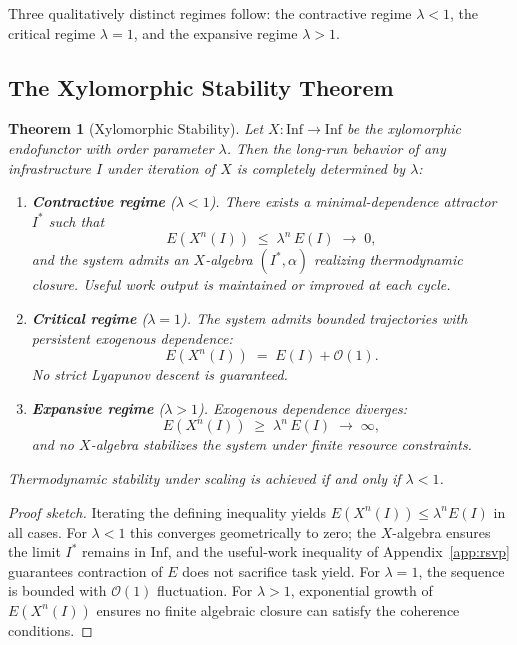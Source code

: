\documentclass[11pt,a4paper]{article}
\theoremstyle{plain}
\newtheorem{theorem}{Theorem}
\theoremstyle{definition}
\theoremstyle{remark}
\begin{document}
Three qualitatively distinct regimes follow: the contractive regime
$\lambda < 1$, the critical regime $\lambda = 1$, and the expansive regime
$\lambda > 1$.

\subsection{The Xylomorphic Stability Theorem}

\begin{theorem}[Xylomorphic Stability]
\label{thm:stability}
Let $X : \mathrm{Inf} \to \mathrm{Inf}$ be the xylomorphic endofunctor with
order parameter $\lambda$. Then the long-run behavior of any infrastructure
$I$ under iteration of $X$ is completely determined by $\lambda$:
\begin{enumerate}
\item \textbf{Contractive regime} ($\lambda < 1$). There exists a
  minimal-dependence attractor $I^{*}$ such that
  \[
    E(X^{n}(I)) \;\leq\; \lambda^{n}\,E(I) \;\longrightarrow\; 0,
  \]
  and the system admits an $X$-algebra $(I^{*},\alpha)$ realizing
  thermodynamic closure. Useful work output is maintained or improved at each
  cycle.
\item \textbf{Critical regime} ($\lambda = 1$). The system admits bounded
  trajectories with persistent exogenous dependence:
  \[
    E(X^{n}(I)) \;=\; E(I) + \mathcal{O}(1).
  \]
  No strict Lyapunov descent is guaranteed.
\item \textbf{Expansive regime} ($\lambda > 1$). Exogenous dependence
  diverges:
  \[
    E(X^{n}(I)) \;\geq\; \lambda^{n}\,E(I) \;\longrightarrow\; \infty,
  \]
  and no $X$-algebra stabilizes the system under finite resource constraints.
\end{enumerate}
Thermodynamic stability under scaling is achieved if and only if $\lambda < 1$.
\end{theorem}

\begin{proof}[Proof sketch]
Iterating the defining inequality yields $E(X^{n}(I)) \leq \lambda^{n} E(I)$
in all cases. For $\lambda < 1$ this converges geometrically to zero; the
$X$-algebra ensures the limit $I^{*}$ remains in $\mathrm{Inf}$, and the
useful-work inequality of Appendix~\ref{app:rsvp} guarantees contraction of
$E$ does not sacrifice task yield. For $\lambda = 1$, the sequence is bounded
with $\mathcal{O}(1)$ fluctuation. For $\lambda > 1$, exponential growth of
$E(X^n(I))$ ensures no finite algebraic closure can satisfy the coherence
conditions.
\end{proof}
\end{document}
